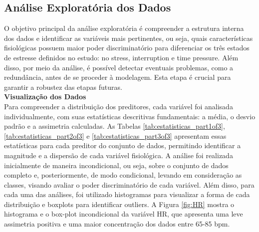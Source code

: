 
\subsection{Análise Exploratória dos Dados}

O objetivo principal da análise exploratória é compreender a estrutura interna dos dados e identificar as variáveis mais pertinentes, ou seja, quais características fisiológicas possuem maior poder discriminatório para diferenciar os três estados de estresse definidos no estudo: no stress, interruption e time pressure. Além disso, por meio da análise, é possível detectar eventuais problemas, como a redundância, antes de se proceder à modelagem. Esta etapa é crucial para garantir a robustez das etapas futuras.\\

\noindent \textbf{Visualização dos Dados}\\

Para compreender a distribuição dos preditores, cada variável foi analisada individualmente, com suas estatísticas descritivas fundamentais: a média, o desvio padrão e a assimetria calculadas. As Tabelas \ref{tab:estatisticas_part1of3}, \ref{tab:estatisticas_part2of3} e \ref{tab:estatisticas_part3of3} apresentam essas estatísticas para cada preditor do conjunto de dados, permitindo identificar a magnitude e a dispersão de cada variável fisiológica. A análise foi realizada inicialmente de maneira incondicional, ou seja, sobre o conjunto de dados completo e, posteriormente, de modo condicional, levando em consideração as classes, visando avaliar o poder discriminatório de cada variável. Além disso, para cada uma das análises, foi  utilizado histogramas para visualizar a forma de cada distribuição e boxplots para identificar outliers. A Figura \ref{fig:HR} mostra o histograma e o box-plot incondicional da variável HR, que apresenta uma leve assimetria positiva e uma maior concentração dos dados entre 65-85 bpm. 


